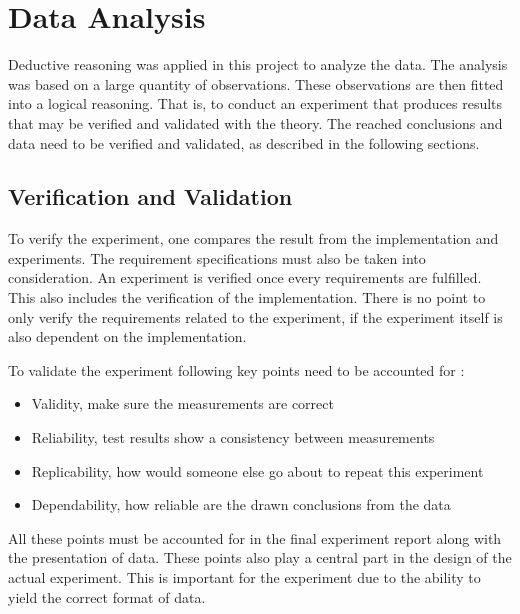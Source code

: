 \documentclass[a4paper,11pt]{kth-mag}
\begin{document}
\section{Data Analysis}
Deductive reasoning was applied in this project to analyze the data.
The analysis was based on a large quantity of observations.
These observations are then fitted into a logical reasoning.
That is, to conduct an experiment that produces results that may be verified and validated with the theory.
The reached conclusions and data need to be verified and validated, as described in the following sections.

\subsection{Verification and Validation}
To verify the experiment, one compares the result from the implementation and experiments.
The requirement specifications must also be taken into consideration.
An experiment is verified once every requirements are fulfilled.
This also includes the verification of the implementation.
There is no point to only verify the requirements related to the experiment,
if the experiment itself is also dependent on the implementation.

To validate the experiment following key points need to be accounted for \cite{haakansson2013portal}:

\begin{itemize}
    \item Validity, make sure the measurements are correct
    \item Reliability, test results show a consistency between measurements
    \item Replicability, how would someone else go about to repeat this experiment
    \item Dependability, how reliable are the drawn conclusions from the data
\end{itemize}

All these points must be accounted for in the final experiment report along with the presentation of data.
These points also play a central part in the design of the actual experiment.
This is important for the experiment due to the ability to yield the correct format of data.

\end{document}
